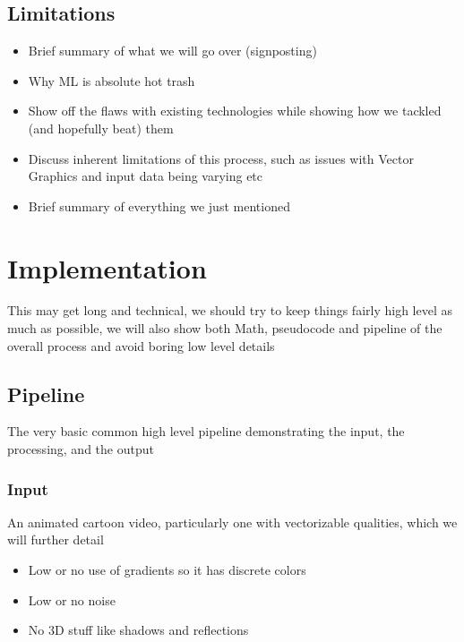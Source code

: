 \documentclass[12pt]{article}
\begin{document}
    \subsection{Limitations}\label{subsec:limitations}

    \begin{itemize}
        \item Brief summary of what we will go over (signposting)
        \item Why ML is absolute hot trash
        \item Show off the flaws with existing technologies while showing how we tackled (and hopefully beat) them
        \item Discuss inherent limitations of this process, such as issues with Vector Graphics and input data being varying etc
        \item Brief summary of everything we just mentioned
    \end{itemize}

    \pagebreak


    \section{Implementation}\label{sec:implementation}

    This may get long and technical, we should try to keep things fairly high level as much as possible,
    we will also show both Math, pseudocode and pipeline of the overall process and avoid boring low level details

    \subsection{Pipeline}\label{subsec:pipeline}

    The very basic common high level pipeline demonstrating the input, the processing, and the output

    \subsubsection{Input}

    An animated cartoon video, particularly one with vectorizable qualities, which we will further detail
    \begin{itemize}
        \item Low or no use of gradients so it has discrete colors
        \item Low or no noise
        \item No 3D stuff like shadows and reflections
    \end{itemize}
\end{document}
